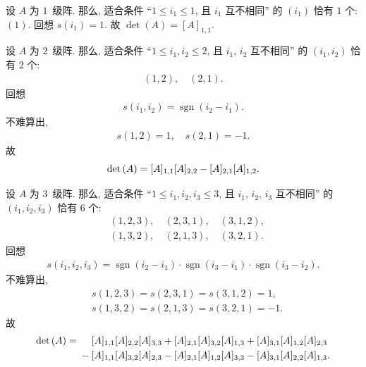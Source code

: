 \documentclass[../libro.tex]{subfiles}
\begin{document}
\begin{example}
    设 \(A\) 为 \(1\)~级阵.
    那么, 适合条件
    ``\(1 \leq i_1 \leq 1\),
    且 \(i_1\) 互不相同'' 的
    \((i_1)\) 恰有 \(1\) 个:
    \((1)\).
    回想 \(s(i_1) = 1\).
    故 \(\det {(A)} = [A]_{1,1}\).
\end{example}

\begin{example}
    设 \(A\) 为 \(2\)~级阵.
    那么, 适合条件
    ``\(1 \leq i_1, i_2 \leq 2\),
    且 \(i_1\), \(i_2\) 互不相同'' 的
    \((i_1, i_2)\) 恰有 \(2\) 个:
    \begin{align*}
        (1, 2), \quad (2, 1).
    \end{align*}
    回想
    \begin{align*}
        s(i_1, i_2)
        = \operatorname{sgn} {(i_2 - i_1)}.
    \end{align*}
    不难算出,
    \begin{align*}
        s(1, 2) = 1, \quad s(2, 1) = -1.
    \end{align*}
    故
    \begin{equation*}
        \det {(A)}
        = [A]_{1,1} [A]_{2,2} - [A]_{2,1} [A]_{1,2}.
        \qedhere
    \end{equation*}
\end{example}

\begin{example}
    设 \(A\) 为 \(3\)~级阵.
    那么, 适合条件
    ``\(1 \leq i_1, i_2, i_3 \leq 3\),
    且 \(i_1\), \(i_2\), \(i_3\) 互不相同'' 的
    \((i_1, i_2, i_3)\) 恰有 \(6\) 个:
    \begin{align*}
        & (1, 2, 3), \quad (2, 3, 1), \quad (3, 1, 2), \\
        & (1, 3, 2), \quad (2, 1, 3), \quad (3, 2, 1).
    \end{align*}
    回想
    \begin{align*}
        s(i_1, i_2, i_3)
        = \operatorname{sgn} {(i_2 - i_1)}
        \cdot \operatorname{sgn} {(i_3 - i_1)}
        \cdot \operatorname{sgn} {(i_3 - i_2)}.
    \end{align*}
    不难算出,
    \begin{align*}
        & s(1, 2, 3) = s(2, 3, 1) = s(3, 1, 2) = 1,  \\
        & s(1, 3, 2) = s(2, 1, 3) = s(3, 2, 1) = -1.
    \end{align*}
    故
    \begin{align*}
        \det {(A)}
        = {} &
        \hphantom{{} + {}}
        [A]_{1,1} [A]_{2,2} [A]_{3,3}
        + [A]_{2,1} [A]_{3,2} [A]_{1,3}
        + [A]_{3,1} [A]_{1,2} [A]_{2,3}
        \\
        &
        - [A]_{1,1} [A]_{3,2} [A]_{2,3}
        - [A]_{2,1} [A]_{1,2} [A]_{3,3}
        - [A]_{3,1} [A]_{2,2} [A]_{1,3}.
        \qefhere
    \end{align*}
\end{example}
\end{document}
